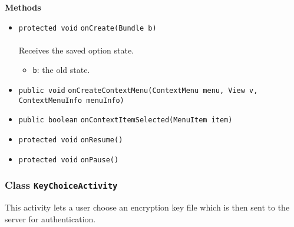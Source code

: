 \textbf{\sffamily Methods}
\begin{itemize}
\item \lstinline|protected void| \lstinline|onCreate|\lstinline|(Bundle b)|\\ \\[-0.6em]
Receives the saved option state.
\begin{itemize}
\item \lstinline|b|: the old state.
\end{itemize}



\item \lstinline|public void| \lstinline|onCreateContextMenu|\lstinline|(ContextMenu menu, View v, ContextMenuInfo menuInfo)| \\[-0.6em]




\item \lstinline|public boolean| \lstinline|onContextItemSelected|\lstinline|(MenuItem item)| \\[-0.6em]




\item \lstinline|protected void| \lstinline|onResume|\lstinline|()| \\[-0.6em]




\item \lstinline|protected void| \lstinline|onPause|\lstinline|()| \\[-0.6em]




\end{itemize}

\subsubsection{Class \lstinline|KeyChoiceActivity|}
This activity lets a user choose an encryption key file
 which is then sent to the server for authentication. \\
\noindent\begin{minipage}[t]{5cm}
\vspace{0.3em}
\hspace*{2em}
\vspace{0.3em}
\end{minipage}




